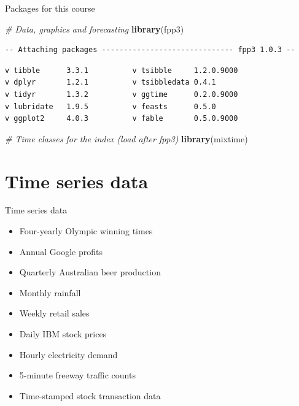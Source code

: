 \documentclass[
  14pt,
  ignorenonframetext,
  aspectratio=169,
]{beamer}
\newenvironment{Shaded}{\begin{snugshade}}{\end{snugshade}}
\newcommand{\CommentTok}[1]{\textcolor[rgb]{0.56,0.35,0.01}{\textit{#1}}}
\newcommand{\FunctionTok}[1]{\textcolor[rgb]{0.13,0.29,0.53}{\textbf{#1}}}
\newcommand{\NormalTok}[1]{#1}
\providecommand{\tightlist}{%
  \setlength{\itemsep}{0pt}\setlength{\parskip}{0pt}}
\renewenvironment{Shaded}{\vspace*{0.15cm}\color{black}\fontsize{10}{10}\sf\begin{snugshade}\color{black}}{\end{snugshade}}
\begin{document}
\begin{frame}[fragile]{Packages for this course}
\protect{}\label{packages-for-this-course-1}
\fontsize{11}{12}\sf

\begin{Shaded}
\begin{Highlighting}[]
\CommentTok{\# Data, graphics and forecasting}
\FunctionTok{library}\NormalTok{(fpp3)}
\end{Highlighting}
\end{Shaded}

\begin{verbatim}
-- Attaching packages ------------------------------ fpp3 1.0.3 --
\end{verbatim}

\begin{verbatim}
v tibble      3.3.1          v tsibble     1.2.0.9000
v dplyr       1.2.1          v tsibbledata 0.4.1     
v tidyr       1.3.2          v ggtime      0.2.0.9000
v lubridate   1.9.5          v feasts      0.5.0     
v ggplot2     4.0.3          v fable       0.5.0.9000
\end{verbatim}

\pause

\begin{Shaded}
\begin{Highlighting}[]
\CommentTok{\# Time classes for the index (load after fpp3)}
\FunctionTok{library}\NormalTok{(mixtime)}
\end{Highlighting}
\end{Shaded}
\end{frame}

\section{Time series data}\label{time-series-data}

\begin{frame}{Time series data}
\protect{}\label{time-series-data-1}
\begin{itemize}
\tightlist
\item
  Four-yearly Olympic winning times
\item
  Annual Google profits
\item
  Quarterly Australian beer production
\item
  Monthly rainfall
\item
  Weekly retail sales
\item
  Daily IBM stock prices
\item
  Hourly electricity demand
\item
  5-minute freeway traffic counts
\item
  Time-stamped stock transaction data
\end{itemize}
\end{frame}
\end{document}
